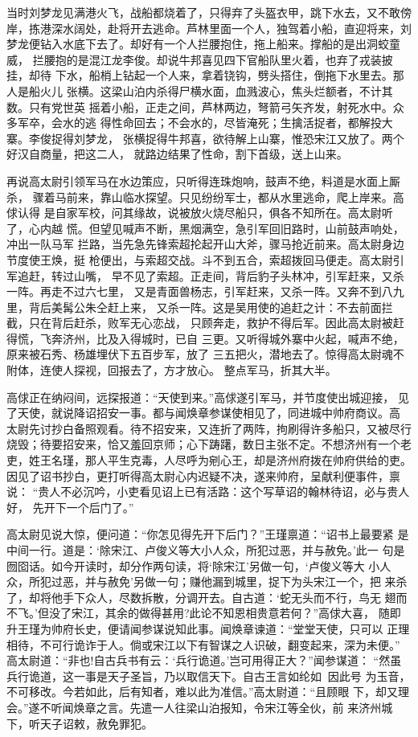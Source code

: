 当时刘梦龙见满港火飞，战船都烧着了，只得弃了头盔衣甲，跳下水去，又不敢傍
岸，拣港深水阔处，赴将开去逃命。芦林里面一个人，独驾着小船，直迎将来，刘
梦龙便钻入水底下去了。却好有一个人拦腰抱住，拖上船来。撑船的是出洞蛟童威，
拦腰抱的是混江龙李俊。却说牛邦喜见四下官船队里火着，也弃了戎装披挂，却待
下水，船梢上钻起一个人来，拿着铙钩，劈头搭住，倒拖下水里去。那人是船火儿
张横。这梁山泊内杀得尸横水面，血溅波心，焦头烂额者，不计其数。只有党世英
摇着小船，正走之间，芦林两边，弩箭弓矢齐发，射死水中。众多军卒，会水的逃
得性命回去；不会水的，尽皆淹死；生擒活捉者，都解投大寨。李俊捉得刘梦龙，
张横捉得牛邦喜，欲待解上山寨，惟恐宋江又放了。两个好汉自商量，把这二人，
就路边结果了性命，割下首级，送上山来。

再说高太尉引领军马在水边策应，只听得连珠炮响，鼓声不绝，料道是水面上厮杀，
骤着马前来，靠山临水探望。只见纷纷军士，都从水里逃命，爬上岸来。高俅认得
是自家军校，问其缘故，说被放火烧尽船只，俱各不知所在。高太尉听了，心内越
慌。但望见喊声不断，黑烟满空，急引军回旧路时，山前鼓声响处，冲出一队马军
拦路，当先急先锋索超抡起开山大斧，骤马抢近前来。高太尉身边节度使王焕，挺
枪便出，与索超交战。斗不到五合，索超拨回马便走。高太尉引军追赶，转过山嘴，
早不见了索超。正走间，背后豹子头林冲，引军赶来，又杀一阵。再走不过六七里，
又是青面兽杨志，引军赶来，又杀一阵。又奔不到八九里，背后美髯公朱仝赶上来，
又杀一阵。这是吴用使的追赶之计：不去前面拦截，只在背后赶杀，败军无心恋战，
只顾奔走，救护不得后军。因此高太尉被赶得慌，飞奔济州，比及入得城时，已自
三更。又听得城外寨中火起，喊声不绝，原来被石秀、杨雄埋伏下五百步军，放了
三五把火，潜地去了。惊得高太尉魂不附体，连使人探视，回报去了，方才放心。
整点军马，折其大半。

高俅正在纳闷间，远探报道：“天使到来。”高俅遂引军马，并节度使出城迎接，
见了天使，就说降诏招安一事。都与闻焕章参谋使相见了，同进城中帅府商议。高
太尉先讨抄白备照观看。待不招安来，又连折了两阵，拘刷得许多船只，又被尽行
烧毁；待要招安来，恰又羞回京师；心下踌躇，数日主张不定。不想济州有一个老
吏，姓王名瑾，那人平生克毒，人尽呼为剜心王，却是济州府拨在帅府供给的吏。
因见了诏书抄白，更打听得高太尉心内迟疑不决，遂来帅府，呈献利便事件，禀说：
“贵人不必沉吟，小吏看见诏上已有活路：这个写草诏的翰林待诏，必与贵人好，
先开下一个后门了。”

高太尉见说大惊，便问道：“你怎见得先开下后门？”王瑾禀道：“诏书上最要紧
是中间一行。道是：‘除宋江、卢俊义等大小人众，所犯过恶，并与赦免。’此一
句是囫囵话。如今开读时，却分作两句读，将‘除宋江’另做一句，‘卢俊义等大
小人众，所犯过恶，并与赦免’另做一句；赚他漏到城里，捉下为头宋江一个，把
来杀了，却将他手下众人，尽数拆散，分调开去。自古道：‘蛇无头而不行，鸟无
翅而不飞。’但没了宋江，其余的做得甚用?此论不知恩相贵意若何？”高俅大喜，
随即升王瑾为帅府长史，便请闻参谋说知此事。闻焕章谏道：“堂堂天使，只可以
正理相待，不可行诡诈于人。倘或宋江以下有智谋之人识破，翻变起来，深为未便。”
高太尉道：“非也!自古兵书有云：‘兵行诡道。’岂可用得正大？”闻参谋道：
“然虽兵行诡道，这一事是天子圣旨，乃以取信天下。自古王言如纶如，因此号
为玉音，不可移改。今若如此，后有知者，难以此为准信。”高太尉道：“且顾眼
下，却又理会。”遂不听闻焕章之言。先遣一人往梁山泊报知，令宋江等全伙，前
来济州城下，听天子诏敕，赦免罪犯。

